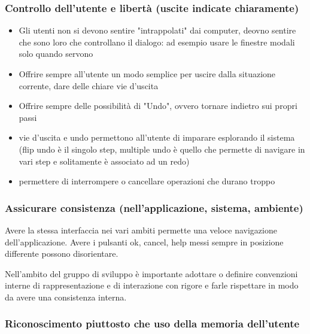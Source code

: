 \documentclass[11pt,a4paper]{book}
\begin{document}
\subsubsection{Controllo dell'utente e libertà (uscite indicate chiaramente)}
\begin{itemize}
	\item Gli utenti non si devono sentire "intrappolati" dai computer, deovno sentire che sono loro che controllano il dialogo: ad esempio usare le finestre modali solo quando servono
	\item Offrire sempre all'utente un modo semplice per uscire dalla situazione corrente, dare delle chiare vie d'uscita
	\item Offrire sempre delle possibilità di "Undo", ovvero tornare indietro sui propri passi
	\item vie d'uscita e undo permettono all'utente di imparare esplorando il sistema (flip undo è il singolo step, multiple undo è quello che permette di navigare in vari step e solitamente è associato ad un redo)
	\item permettere di interrompere o cancellare operazioni che durano troppo
\end{itemize}

\subsubsection{Assicurare consistenza (nell'applicazione, sistema, ambiente)}
Avere la stessa interfaccia nei vari ambiti permette una veloce navigazione dell'applicazione. Avere i pulsanti ok, cancel, help messi sempre in posizione differente possono disorientare.

Nell'ambito del gruppo di sviluppo è importante adottare o definire convenzioni interne di rappresentazione e di interazione con rigore e farle rispettare in modo da avere una consistenza interna.

\subsubsection{Riconoscimento piuttosto che uso della memoria dell'utente}
\end{document}
